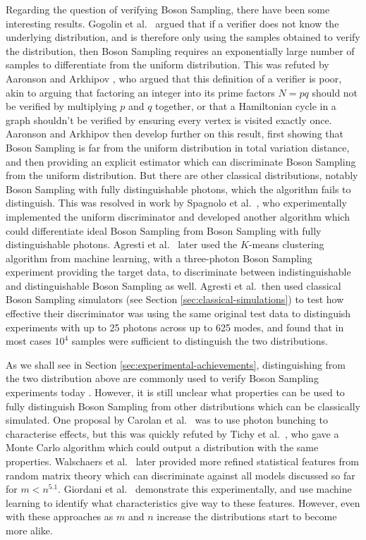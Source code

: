 Regarding the question of verifying Boson Sampling, there have been some interesting results. Gogolin et al.~\cite{gogolin2013} argued that if a verifier does not know the underlying distribution, and is therefore only using the samples obtained to verify the distribution, then Boson Sampling requires an exponentially large number of samples to differentiate from the uniform distribution. This was refuted by Aaronson and Arkhipov \cite{aaronson2014}, who argued that this definition of a verifier is poor, akin to arguing that factoring an integer into its prime factors $N=pq$ should not be verified by multiplying $p$ and $q$ together, or that a Hamiltonian cycle in a graph shouldn't be verified by ensuring every vertex is visited exactly once. Aaronson and Arkhipov then develop further on this result, first showing that Boson Sampling is far from the uniform distribution in total variation distance, and then providing an explicit estimator which can discriminate Boson Sampling from the uniform distribution. But there are other classical distributions, notably Boson Sampling with fully distinguishable photons, which the algorithm fails to distinguish. This was resolved in work by Spagnolo et al.~\cite{spagnolo2014}, who experimentally implemented the uniform discriminator and developed another algorithm which could differentiate ideal Boson Sampling from Boson Sampling with fully distinguishable photons. Agresti et al.~\cite{agresti2019} later used the $K$-means clustering algorithm from machine learning, with a three-photon Boson Sampling experiment providing the target data, to discriminate between indistinguishable and distinguishable Boson Sampling as well. Agresti et al.\ then used classical Boson Sampling simulators (see Section \ref{sec:classical-simulations}) to test how effective their discriminator was using the same original test data to distinguish experiments with up to 25 photons across up to 625 modes, and found that in most cases $10^4$ samples were sufficient to distinguish the two distributions.

As we shall see in Section \ref{sec:experimental-achievements}, distinguishing from the two distribution above are commonly used to verify Boson Sampling experiments today \cite{carolan2015, zhong2018, paesani2018, wang2019}. However, it is still unclear what properties can be used to fully distinguish Boson Sampling from other distributions which can be classically simulated. One proposal by Carolan et al.~\cite{carolan2014} was to use photon bunching to characterise effects, but this was quickly refuted by Tichy et al.~\cite{tichy2014}, who gave a Monte Carlo algorithm which could output a distribution with the same properties. Walschaers et al.~\cite{walschaers2016, walschaers2016thesis} later provided more refined statistical features from random matrix theory which can discriminate against all models discussed so far for $m<n^{5.1}$. Giordani et al.~\cite{giordani2018} demonstrate this experimentally, and use machine learning to identify what characteristics give way to these features. However, even with these approaches as $m$ and $n$ increase the distributions start to become more alike.

